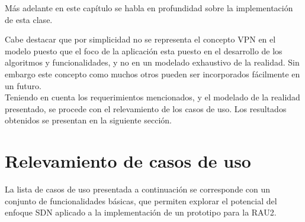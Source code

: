M\'as adelante en este cap\'itulo se habla en profundidad sobre la implementaci\'on de esta clase.

Cabe destacar que por simplicidad no se representa el concepto VPN en el modelo puesto que el foco de la aplicación esta puesto en el desarrollo de los algoritmos y funcionalidades, y no en un modelado exhaustivo de la realidad. Sin embargo este concepto como muchos otros pueden ser incorporados fácilmente en un futuro.\\

Teniendo en cuenta los requerimientos mencionados, y el modelado de la realidad presentado, se procede con el relevamiento de los casos de uso. Los resultados obtenidos se presentan en la siguiente secci\'on.

\section[Relevamiento de casos de uso]{Relevamiento de casos de uso}
La lista de casos de uso presentada a continuaci\'on se corresponde con un conjunto de funcionalidades b\'asicas, que permiten explorar el potencial del enfoque SDN aplicado a la implementaci\'on de un prototipo para la RAU2.\\ 

